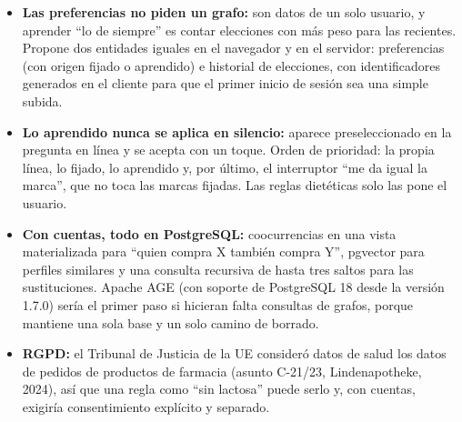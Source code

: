 \begin{tcolorbox}[colback=responsecolor, title=Insights de Claude, colframe=gray!60!black, breakable]
	\begin{itemize}
		\item \textbf{Las preferencias no piden un grafo:} son datos de un solo usuario, y aprender ``lo de siempre'' es contar elecciones con más peso para las recientes. Propone dos entidades iguales en el navegador y en el servidor: preferencias (con origen fijado o aprendido) e historial de elecciones, con identificadores generados en el cliente para que el primer inicio de sesión sea una simple subida.

		\item \textbf{Lo aprendido nunca se aplica en silencio:} aparece preseleccionado en la pregunta en línea y se acepta con un toque. Orden de prioridad: la propia línea, lo fijado, lo aprendido y, por último, el interruptor ``me da igual la marca'', que no toca las marcas fijadas. Las reglas dietéticas solo las pone el usuario.

		\item \textbf{Con cuentas, todo en PostgreSQL:} coocurrencias en una vista materializada para ``quien compra X también compra Y'', pgvector para perfiles similares y una consulta recursiva de hasta tres saltos para las sustituciones. Apache AGE (con soporte de PostgreSQL 18 desde la versión 1.7.0) sería el primer paso si hicieran falta consultas de grafos, porque mantiene una sola base y un solo camino de borrado.

		\item \textbf{RGPD:} el Tribunal de Justicia de la UE consideró datos de salud los datos de pedidos de productos de farmacia (asunto C-21/23, Lindenapotheke, 2024), así que una regla como ``sin lactosa'' puede serlo y, con cuentas, exigiría consentimiento explícito y separado.
	\end{itemize}
\end{tcolorbox}

